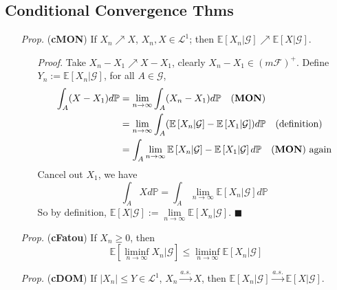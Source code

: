 \documentclass[a4paper,12pt,twoside]{book}
\begin{document}
\subsection{Conditional Convergence Thms}
\begin{itemize}
	\item[\textit{Prop.}] (\textbf{cMON}) If $X_n \nearrow X$, $X_n, X \in \mathcal{L}^1$; then $\mathbb{E}\left[X_n|\mathcal{G}\right]\nearrow \mathbb{E}\left[X|\mathcal{G}\right]$.
	\begin{itemize}
		\item[\textit{Proof}.] Take $X_n - X_1 \nearrow X-X_1$, clearly $X_n-X_1 \in (m \mathcal{F})^+$. Define $Y_n:=\mathbb{E}\left[X_n|\mathcal{G}\right]$, for all $A\in \mathcal{G}$, 
		\begin{equation}
			\begin{split}
				\int_A (X-X_1) d\mathbb{P} &= \lim\limits_{n\rightarrow\infty}\int_A (X_n - X_1) d\mathbb{P}~~\text{ (\textbf{MON})}\\
				&= \lim\limits_{n\rightarrow\infty} \int_A (\mathbb{E}\left[X_n|\mathcal{G}\right] - \mathbb{E}\left[X_1|\mathcal{G}\right]) d\mathbb{P}~~\text{ (definition)}\\
				&= \int_A \lim\limits_{n\rightarrow\infty} \mathbb{E}\left[X_n|\mathcal{G}\right] - \mathbb{E}\left[X_1|\mathcal{G}\right] d\mathbb{P}~~\text{ (\textbf{MON}) again}\\
			\end{split}
		\end{equation}
		Cancel out $X_1$, we have
		\begin{equation}
			\int_A X d\mathbb{P} = \int_A \lim\limits_{n\rightarrow\infty}\mathbb{E}\left[X_n|\mathcal{G}\right] d\mathbb{P} 
		\end{equation}
		So by definition, $\mathbb{E}\left[X|\mathcal{G}\right]:= \lim\limits_{n\rightarrow\infty}\mathbb{E}\left[X_n|\mathcal{G}\right]$. $\blacksquare$
	\end{itemize}

	\item[\textit{Prop.}] (\textbf{cFatou}) If $X_n\geq 0$, then
	\begin{equation}
		\mathbb{E}\left[\liminf\limits_{n\rightarrow\infty}X_n|\mathcal{G}\right]\leq \liminf\limits_{n\rightarrow\infty} \mathbb{E}\left[X_n|\mathcal{G}\right]
	\end{equation}

	\item[\textit{Prop.}] (\textbf{cDOM}) If $|X_n|\leq Y\in \mathcal{L}^1$, $X_n \xrightarrow{a.s.} X$, then $\mathbb{E}\left[X_n|\mathcal{G}\right] \xrightarrow{a.s.} \mathbb{E}\left[X|\mathcal{G}\right]$.


\end{itemize}
\end{document}
